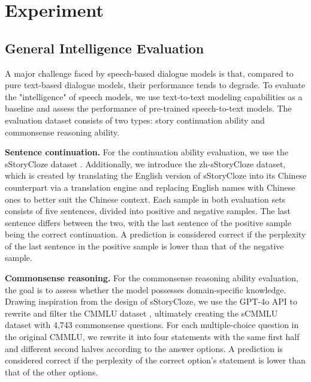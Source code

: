 \section{Experiment}

\subsection{General Intelligence Evaluation}
A major challenge faced by speech-based dialogue models is that, compared to pure text-based dialogue models, their performance tends to degrade. To evaluate the "intelligence" of speech models, we use text-to-text modeling capabilities as a baseline and assess the performance of pre-trained speech-to-text models. The evaluation dataset consists of two types: story continuation ability and commonsense reasoning ability.

\textbf{Sentence continuation.}
For the continuation ability evaluation, we use the sStoryCloze dataset \cite{hassid2024textually}. Additionally, we introduce the zh-sStoryCloze dataset, which is created by translating the English version of sStoryCloze into its Chinese counterpart via a translation engine and replacing English names with Chinese ones to better suit the Chinese context. Each sample in both evaluation sets consists of five sentences, divided into positive and negative samples. The last sentence differs between the two, with the last sentence of the positive sample being the correct continuation. A prediction is considered correct if the perplexity of the last sentence in the positive sample is lower than that of the negative sample.

\textbf{Commonsense reasoning.}
For the commonsense reasoning ability evaluation, the goal is to assess whether the model possesses domain-specific knowledge. Drawing inspiration from the design of sStoryCloze, we use the GPT-4o API to rewrite and filter the CMMLU dataset \cite{li2023cmmlu}, ultimately creating the sCMMLU dataset with 4,743 commonsense questions. For each multiple-choice question in the original CMMLU, we rewrite it into four statements with the same first half and different second halves according to the answer options. A prediction is considered correct if the perplexity of the correct option's statement is lower than that of the other options.

